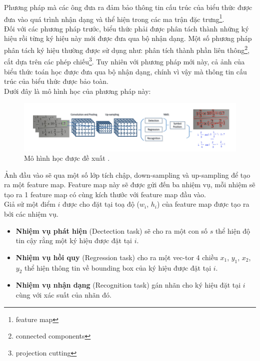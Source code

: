 \documentclass[a4paper,12pt]{article}
\begin{document}
	Phương pháp mà các ông đưa ra đảm bảo thông tin cấu trúc của biểu thức được đưa vào quá trình nhận dạng và thể hiện trong các ma trận đặc trưng\footnote{feature map}\cite{yanlecun}. \\
	Đối với các phương pháp trước, biểu thức phải được phân tách thành những ký hiệu rồi từng ký hiệu này mới được đưa qua bộ nhận dạng. Một số phương pháp phân tách ký hiệu thường được sử dụng như: phân tích thành phần liên thông\footnote{connected components}, cắt dựa trên các phép chiếu\footnote{projection cutting}\cite{segment}. Tuy nhiên với phương pháp mới này, cả ảnh của biểu thức toán học được đưa qua bộ nhận dạng, chính vì vậy mà thông tin cấu trúc của biểu thức được bảo toàn. \\
	
	Dưới đây là mô hình học của phương pháp này:\\
	
	\begin{figure}[!h]
		\includegraphics[]{context_aware.png}
		\vspace{0.2cm}
		\caption{Mô hình học được đề xuất \cite{context}.}
		
	\end{figure}
	
	Ảnh đầu vào sẽ qua một số lớp tích chập, down-sampling và up-sampling để tạo ra một feature map. Feature map này sẽ được gửi đến ba nhiệm vụ, mỗi nhiệm sẽ tạo ra 1 feature map có cùng kích thước với feature map đầu vào. \\
	Giả sử một điểm $i$ được cho đặt tại toạ độ ($w_i$, $h_i$) của feature map được tạo ra bởi các nhiệm vụ. 
	\begin{itemize}
		\item \textbf{Nhiệm vụ phát hiện} (Dectection task) sẽ cho ra một con số $s$ thể hiện độ tin cậy rằng một ký hiệu được đặt tại $i$.
		\item \textbf{Nhiệm vụ hồi quy} (Regression task) cho ra một vec-tor 4 chiều {$x_1$, $y_1$, $x_2$, $y_2$} thể hiện thông tin về bounding box của ký hiệu được đặt tại $i$.
		\item\textbf{Nhiệm vụ nhận dạng} (Recognition task) gán nhãn cho ký hiệu đặt tại $i$ cùng với xác suất của nhãn đó. 
	\end{itemize}
	
\end{document}
